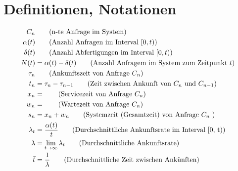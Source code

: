 \documentclass[a4paper, 11pt, accentcolor = tud3b]{tudreport}
\begin{document}
        \section{Definitionen, Notationen}
	        \begin{align*}
	        	C _ n       & \tag{n-te Anfrage im System}                                                                                                                \\
	        	\alpha(t)   & \tag{Anzahl Anfragen im Interval \( [0, t) \)}                                                                                              \\
	        	\delta(t)   & \tag{Anzahl Abfertigungen im Interval \( [0, t) \)}                                                                                         \\
	        	N(t)        & = \alpha(t) - \delta(t) \tag{Anzahl Anfragem im System zum Zeitpunkt \( t \)}                                                               \\
	        	\tau _ n    & \tag{Ankunftszeit von Anfrage \( C _ n \)}                                                                                                  \\
	        	t _ n       & = \tau _ n - \tau _ { n - 1 } \tag{Zeit zwischen Ankunft von \( C _ n \) und \( C _ { n - 1 } \)}                                           \\
	        	x _ n       & = \tag{Servicezeit von Anfrage \( C _ n \)}                                                                                                 \\
	        	w _ n       & = \tag{Wartezeit von Anfrage \( C _ n \)}                                                                                                   \\
	        	s _ n       & = x _ n + w _ n \tag{Systemzeit (Gesamtzeit) von Anfrage \( C _ n \) }                                                                      \\
	        	\lambda _ t & = \frac{\alpha(t)}{t} \tag{Durchschnittliche Ankunftsrate im Interval [0, t)}                                                               \\
	        	\lambda     & = \lim\limits _ {t \to \infty} \lambda _ t \tag{Durchschnittliche Ankunftsrate}                                                             \\
	        	\bar{t}     & = \frac{1}{\lambda} \tag{Durchschnittliche Zeit zwischen Ankünften}                                                                         \\

\end{align*}
\end{document}
